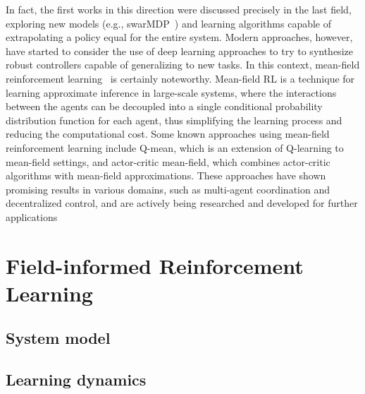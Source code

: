 \documentclass[conference]{IEEEtran}
\begin{document}
In fact, the first works in this direction were discussed precisely in the last field, 
 exploring new models (e.g., swarMDP~\cite{DBLP:conf/atal/SosicKZK17}) and learning algorithms capable of extrapolating 
 a policy equal for the entire system. 
Modern approaches, however, 
 have started to consider the use of deep learning approaches to try 
 to synthesize robust controllers capable of generalizing to new tasks. 
In this context, mean-field reinforcement learning~\cite{pmlr-v80-yang18d} is certainly noteworthy. 
 Mean-field RL is a technique for learning approximate inference in large-scale systems, 
 where the interactions between the agents can be decoupled into a 
 single conditional probability distribution function for each agent, 
 thus simplifying the learning process and reducing the computational cost.
%
Some known approaches using mean-field reinforcement learning include Q-mean, 
 which is an extension of Q-learning to mean-field settings, 
 and actor-critic mean-field, which combines actor-critic algorithms with mean-field approximations. 
%
These approaches have shown promising results in various domains, such as multi-agent coordination 
 and decentralized control, and are actively being researched and developed for further applications

\section{Field-informed Reinforcement Learning}
\label{sec:approach}
\subsection{System model}
\subsection{Learning dynamics}
\end{document}
